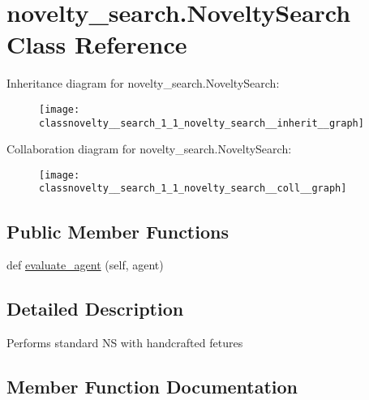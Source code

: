 \hypertarget{classnovelty__search_1_1_novelty_search}{}\section{novelty\+\_\+search.\+Novelty\+Search Class Reference}
\label{classnovelty__search_1_1_novelty_search}


Inheritance diagram for novelty\+\_\+search.\+Novelty\+Search\+:
\nopagebreak
\begin{figure}[H]
\begin{center}
\leavevmode
\texttt{[image: classnovelty\_\_search\_1\_1\_novelty\_search\_\_inherit\_\_graph]}
\end{center}
\end{figure}


Collaboration diagram for novelty\+\_\+search.\+Novelty\+Search\+:
\nopagebreak
\begin{figure}[H]
\begin{center}
\leavevmode
\texttt{[image: classnovelty\_\_search\_1\_1\_novelty\_search\_\_coll\_\_graph]}
\end{center}
\end{figure}
\subsection*{Public Member Functions}
\begin{DoxyCompactItemize}
\item 
def \hyperlink{classnovelty__search_1_1_novelty_search_a486e24a433a71b50dcb54de6bf3b1e7a}{evaluate\+\_\+agent} (self, agent)
\end{DoxyCompactItemize}


\subsection{Detailed Description}
\begin{DoxyVerb}Performs standard NS with handcrafted fetures
\end{DoxyVerb}
 

\subsection{Member Function Documentation}
